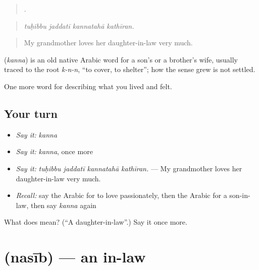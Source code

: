 \begin{quote}
   .
\end{quote}

\begin{quote}
\emph{tuḥibbu jaddatī kannatahā kathīran.}
\end{quote}

\begin{quote}
My grandmother loves her daughter-in-law very much.
\end{quote}

\begin{cousinweb}
\textbf{} (\emph{kanna}) is an old native Arabic word for a son's or a brother's wife, usually traced to the root \emph{k-n-n}, \textquotedblleft{}to cover, to shelter\textquotedblright{}; how the sense grew is not settled.
\end{cousinweb}

\begin{grammarlens}[title={What you've built}]
One more word for describing what you lived and felt.
\end{grammarlens}

\subsection*{Your turn}
\begin{itemize}
\raggedright
  \item \emph{Say it:} \emph{kanna}
  \item \emph{Say it:} \emph{kanna}, once more
  \item \emph{Say it:} \emph{tuḥibbu jaddatī kannatahā kathīran.} — My grandmother loves her daughter-in-law very much.
  \item \emph{Recall:} say the Arabic for to love passionately, then the Arabic for a son-in-law, then say \emph{kanna} again
\end{itemize}

\begin{tcolorbox}[breakable,colback=teal!4,colframe=teal!35!black,title={Before you move on}]
What does  mean? (\textquotedblleft{}A daughter-in-law\textquotedblright{}.) Say it once more.
\end{tcolorbox}
\section[\texorpdfstring{\ar{نسيب} (nasīb)}{نسيب (nasīb)}]{ (nasīb) — an in-law}

